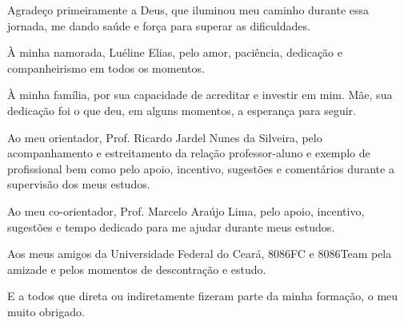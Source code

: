 \begin{agradecimentos}
	Agradeço primeiramente a Deus, que iluminou meu caminho durante essa jornada, me dando saúde e força para superar as dificuldades.
	
	À minha namorada, Luéline Elias, pelo amor, paciência, dedicação e companheirismo em todos os momentos.
	
	À minha família, por sua capacidade de acreditar e investir em mim. Mãe, sua dedicação foi o que deu, em alguns momentos, a esperança para seguir. 
	
	Ao meu orientador, Prof. Ricardo Jardel Nunes da Silveira, pelo acompanhamento e estreitamento da relação professor-aluno e exemplo de profissional bem como pelo apoio, incentivo, sugestões e comentários durante a supervisão dos meus estudos.
	
	Ao meu co-orientador, Prof. Marcelo Araújo Lima, pelo apoio, incentivo, sugestões e tempo dedicado para me ajudar durante meus estudos.
	
	Aos meus amigos da Universidade Federal do Ceará, 8086FC e 8086Team pela amizade e pelos momentos de descontração e estudo.
	
	E a todos que direta ou indiretamente fizeram parte da minha formação, o meu muito obrigado.
\end{agradecimentos}
